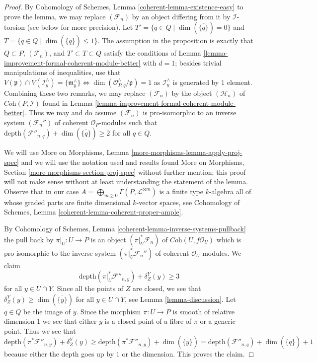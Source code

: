 \documentclass{stacks-project}
\theoremstyle{plain}
\theoremstyle{definition}
\theoremstyle{remark}
\numberwithin{equation}{subsection}
\begin{document}
\begin{proof}
By Cohomology of Schemes, Lemma \ref{coherent-lemma-existence-easy}
to prove the lemma, we may replace $(\mathcal{F}_n)$ by an object
differing from it by $\mathcal{I}$-torsion (see below for more precision).
Let $T' = \{q \in Q \mid \dim(\overline{\{q\}}) = 0\}$
and $T = \{q \in Q \mid \dim(\overline{\{q\}}) \leq 1\}$.
The assumption in the proposition is exactly that
$Q \subset P$, $(\mathcal{F}_n)$, and $T' \subset T \subset Q$
satisfy the conditions of
Lemma \ref{lemma-improvement-formal-coherent-module-better}
with $d = 1$; besides trivial manipulations of inequalities, use that
$V(\mathfrak p) \cap V(\mathcal{I}^\wedge_y) = \{\mathfrak m^\wedge_y\}
\Leftrightarrow \dim(\mathcal{O}_{P, q}^\wedge/\mathfrak p) = 1$
as $\mathcal{I}_y^\wedge$ is generated by $1$ element.
Combining these two remarks, we may replace $(\mathcal{F}_n)$ by the
object $(\mathcal{H}_n)$ of $\textit{Coh}(P, \mathcal{I})$ found in
Lemma \ref{lemma-improvement-formal-coherent-module-better}.
Thus we may and do assume $(\mathcal{F}_n)$ is pro-isomorphic to
an inverse system $(\mathcal{F}_n'')$ of coherent $\mathcal{O}_P$-modules
such that $\text{depth}(\mathcal{F}''_{n, q}) + \dim(\overline{\{q\}}) \geq 2$
for all $q \in Q$.

\medskip\noindent
We will use More on Morphisms, Lemma \ref{more-morphisms-lemma-apply-proj-spec}
and we will use the notation used and results found
More on Morphisms, Section \ref{more-morphisms-section-proj-spec}
without further mention; this proof will not make sense without
at least understanding the statement of the lemma.
Observe that in our case
$A = \bigoplus_{m \geq 0} \Gamma(P, \mathcal{L}^{\otimes m})$
is a finite type $k$-algebra
all of whose graded parts are finite dimensional $k$-vector spaces, see
Cohomology of Schemes, Lemma \ref{coherent-lemma-coherent-proper-ample}.

\medskip\noindent
By Cohomology of Schemes, Lemma \ref{coherent-lemma-inverse-systems-pullback}
the pull back by $\pi|_U : U \to P$ is an object
$(\pi|_U^*\mathcal{F}_n)$ of $\textit{Coh}(U, f\mathcal{O}_U)$
which is pro-isomorphic to the inverse system
$(\pi|_U^*\mathcal{F}_n'')$ of coherent $\mathcal{O}_U$-modules.
We claim
$$
\text{depth}(\pi|_U^*\mathcal{F}''_{n, y}) + \delta_Z^Y(y) \geq 3
$$
for all $y \in U \cap Y$. Since all the points of $Z$ are closed, we
see that $\delta_Z^Y(y) \geq \dim(\overline{\{y\}})$ for all
$y \in U \cap Y$, see Lemma \ref{lemma-discussion}.
Let $q \in Q$ be the image of $y$. Since the morphism $\pi : U \to P$ is
smooth of relative dimension $1$ we see that either $y$ is a closed point
of a fibre of $\pi$ or a generic point.
Thus we see that
$$
\text{depth}(\pi^*\mathcal{F}''_{n, y}) + \delta_Z^Y(y)
\geq
\text{depth}(\pi^*\mathcal{F}''_{n, y}) + \dim(\overline{\{y\}}) =
\text{depth}(\mathcal{F}''_{n, q}) + \dim(\overline{\{q\}}) + 1
$$
because either the depth goes up by $1$ or the dimension.
This proves the claim.


\end{proof}
\end{document}
